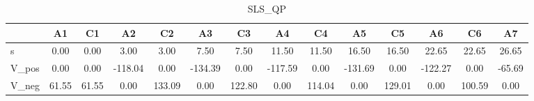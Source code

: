 \begin{table}[H]
\caption{SLS_QP}
\begin{tabular}{lSSSSSSSSSSSSS}
\toprule
{} & {A1} & {C1} & {A2} & {C2} & {A3} & {C3} & {A4} & {C4} & {A5} & {C5} & {A6} & {C6} & {A7} \\
\midrule
s & 0.00 & 0.00 & 3.00 & 3.00 & 7.50 & 7.50 & 11.50 & 11.50 & 16.50 & 16.50 & 22.65 & 22.65 & 26.65 \\
V_pos & 0.00 & 0.00 & -118.04 & 0.00 & -134.39 & 0.00 & -117.59 & 0.00 & -131.69 & 0.00 & -122.27 & 0.00 & -65.69 \\
V_neg & 61.55 & 61.55 & 0.00 & 133.09 & 0.00 & 122.80 & 0.00 & 114.04 & 0.00 & 129.01 & 0.00 & 100.59 & 0.00 \\
\bottomrule
\end{tabular}
\end{table}

